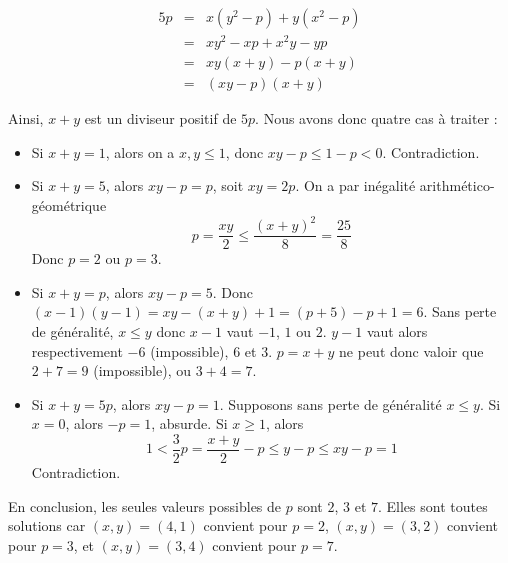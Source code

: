 \begin{eqnarray*}
5p
& = & x(y^2 - p) + y(x^2 - p) \\
& = & xy^2 - xp + x^2y - yp \\
& = & xy(x + y) - p(x + y) \\
& = & (xy - p)(x + y)
\end{eqnarray*}

Ainsi, $x + y$ est un diviseur positif de $5p$. Nous avons donc quatre cas à traiter :
\begin{itemize}
\item Si $x + y = 1$, alors on a $x, y \le 1$, donc $xy - p \le 1 - p < 0$. Contradiction.
\item Si $x + y = 5$, alors $xy - p = p$, soit $xy = 2p$. On a par inégalité arithmético-géométrique
$$p = \frac{xy}2 \le \frac{(x + y)^2}8 = \frac{25}8 $$
Donc $p = 2$ ou $p = 3$.
\item Si $x + y = p$, alors $xy - p = 5$. Donc $(x - 1)(y - 1) = xy - (x + y) + 1 = (p + 5) - p + 1 = 6$. Sans perte de généralité, $x \le y$ donc $x - 1$ vaut $-1$, $1$ ou $2$. $y - 1$ vaut alors respectivement $-6$ (impossible), $6$ et $3$. $p = x + y$ ne peut donc valoir que $2 + 7 = 9$ (impossible), ou $3 +  4 = 7$.
\item Si $x + y = 5p$, alors $xy - p = 1$. Supposons sans perte de généralité $x \le y$. Si $x = 0$, alors $-p = 1$, absurde. Si $x \ge 1$, alors
$$1 < \frac 32 p = \frac{x + y}2 - p \le  y - p \le xy - p = 1$$
Contradiction.
\end{itemize}

En conclusion, les seules valeurs possibles de $p$ sont $2$, $3$ et $7$. Elles sont toutes solutions car $(x, y) = (4, 1)$ convient pour $p = 2$, $(x, y) = (3, 2)$ convient pour $p = 3$, et $(x, y) = (3, 4)$ convient pour $p = 7$.